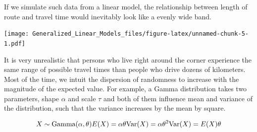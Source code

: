 \documentclass[]{svmono}
\newenvironment{Shaded}{\begin{snugshade}}{\end{snugshade}}
\newcommand{\KeywordTok}[1]{\textcolor[rgb]{0.13,0.29,0.53}{\textbf{#1}}}
\newcommand{\DataTypeTok}[1]{\textcolor[rgb]{0.13,0.29,0.53}{#1}}
\newcommand{\DecValTok}[1]{\textcolor[rgb]{0.00,0.00,0.81}{#1}}
\newcommand{\StringTok}[1]{\textcolor[rgb]{0.31,0.60,0.02}{#1}}
\newcommand{\OperatorTok}[1]{\textcolor[rgb]{0.81,0.36,0.00}{\textbf{#1}}}
\newcommand{\NormalTok}[1]{#1}
\theoremstyle{definition}
\theoremstyle{definition}
\theoremstyle{definition}
\theoremstyle{remark}
\begin{document}
If we simulate such data from a linear model, the relationship between
length of route and travel time would inevitably look like a evenly wide
band.

\begin{Shaded}
\end{Shaded}

\texttt{[image: Generalized\_Linear\_Models\_files/figure-latex/unnamed-chunk-5-1.pdf]}

It is very unrealistic that persons who live right around the corner
experience the same range of possible travel times than people who drive
dozens of kilometers. Most of the time, we intuit the dispersion of
randomness to increase with the magnitude of the expected value. For
example, a Gamma distribution takes two parameters, shape \(\alpha\) and
scale \(\tau\) and both of them influence mean and variance of the
distribution, such that the variance increases by the mean by square.

\[
X \sim \textrm{Gamma}(\alpha, \theta)\\
E(X) = \alpha \theta\\
\textrm{Var}(X) = \alpha \theta^2\\
\textrm{Var}(X) = E(X) \theta
\]
\end{document}
